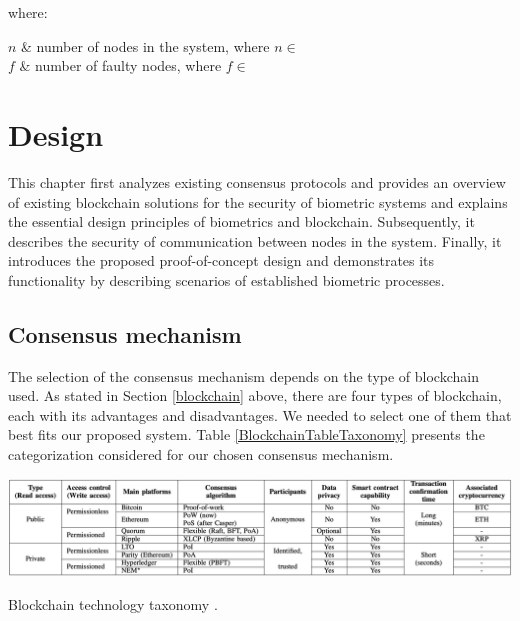 where:
\begin{conditions}
 $n$     &  number of nodes in the system, where $n \in$ \\
 $f$     &  number of faulty nodes, where $f \in$ 
\end{conditions}




\chapter{Design}
This chapter first analyzes existing consensus protocols and provides an overview of existing blockchain solutions for the security of biometric systems and explains the essential design principles of biometrics and blockchain. Subsequently, it describes the security of communication between nodes in the system. Finally, it introduces the proposed proof-of-concept design and demonstrates its functionality by describing scenarios of established biometric processes. 

\section{Consensus mechanism}
The selection of the consensus mechanism depends on the type of blockchain used. 
As stated in Section \ref{blockchain} above, there are four types of blockchain, each with its advantages and disadvantages. We needed to select one of them that best fits our proposed system. Table \ref{BlockchainTableTaxonomy} presents the categorization considered for our chosen consensus mechanism. 

\begin{table}[h]
  \label{BlockchainTableTaxonomy}
  \includegraphics[width=\linewidth]{obrazky-figures/comparisonConsensus.png}
  \caption{Blockchain technology taxonomy \cite{BlockchainMeetsBiometrics}.}
\end{table}

